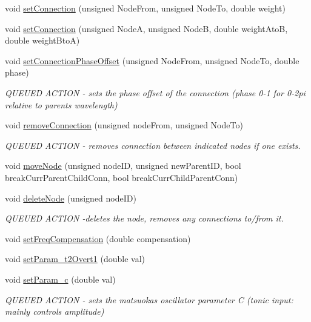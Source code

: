 \begin{DoxyCompactItemize}
\item 
void \mbox{\hyperlink{classMatsuokaEngine_a716d4e8f1dc446179c5424007995ab59}{set\+Connection}} (unsigned Node\+From, unsigned Node\+To, double weight)
\item 
void \mbox{\hyperlink{classMatsuokaEngine_a1335ac9672e6443135d78a8192b5aad5}{set\+Connection}} (unsigned NodeA, unsigned NodeB, double weight\+AtoB, double weight\+BtoA)
\item 
void \mbox{\hyperlink{classMatsuokaEngine_a22045d1c6d6c8bcf2b282c9c98e46f13}{set\+Connection\+Phase\+Offset}} (unsigned Node\+From, unsigned Node\+To, double phase)
\begin{DoxyCompactList}\small\item\em Q\+U\+E\+U\+ED A\+C\+T\+I\+ON -\/ sets the phase offset of the connection (phase 0-\/1 for 0-\/2pi relative to parent\textquotesingle{}s wavelength) \end{DoxyCompactList}\item 
void \mbox{\hyperlink{classMatsuokaEngine_a5a6d42576cafa238d020e62bdc9e2204}{remove\+Connection}} (unsigned node\+From, unsigned Node\+To)
\begin{DoxyCompactList}\small\item\em Q\+U\+E\+U\+ED A\+C\+T\+I\+ON -\/ removes connection between indicated nodes if one exists. \end{DoxyCompactList}\item 
void \mbox{\hyperlink{classMatsuokaEngine_abf37008845614f7b6a7ec0440141e06f}{move\+Node}} (unsigned node\+ID, unsigned new\+Parent\+ID, bool break\+Curr\+Parent\+Child\+Conn, bool break\+Curr\+Child\+Parent\+Conn)
\item 
void \mbox{\hyperlink{classMatsuokaEngine_a475f866cfa6cf0e4249483a4ea2d5816}{delete\+Node}} (unsigned node\+ID)
\begin{DoxyCompactList}\small\item\em Q\+U\+E\+U\+ED A\+C\+T\+I\+ON -\/deletes the node, removes any connections to/from it. \end{DoxyCompactList}\item 
void \mbox{\hyperlink{classMatsuokaEngine_a1b932496b53001762dd0224eced6bd09}{set\+Freq\+Compensation}} (double compensation)
\item 
void \mbox{\hyperlink{classMatsuokaEngine_a22a2a27ba2ad7f8ea7a4121326ac8a21}{set\+Param\+\_\+t2\+Overt1}} (double val)
\item 
void \mbox{\hyperlink{classMatsuokaEngine_ad210d56ae83d896c39e72d93a6263035}{set\+Param\+\_\+c}} (double val)
\begin{DoxyCompactList}\small\item\em Q\+U\+E\+U\+ED A\+C\+T\+I\+ON -\/ sets the matsuoka\textquotesingle{}s oscillator parameter C (tonic input\+: mainly controls amplitude) \end{DoxyCompactList}\item 

\end{DoxyCompactItemize}
